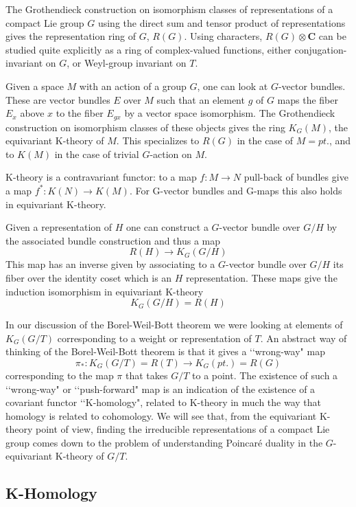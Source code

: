 \documentclass[a4paper,a4paper]{article}
\theoremstyle{conjecture}
\begin{document}
The Grothendieck construction on isomorphism classes of
representations of a compact Lie group $G$ using the direct sum and tensor product
of representations gives the representation
ring of $G$, $R(G)$.  Using characters, $R(G)\otimes \mathbf C$ can be studied quite explicitly
as a ring of complex-valued functions, either conjugation-invariant on $G$, or Weyl-group
invariant on $T$.

Given a space $M$ with an action of a group $G$, one can look at $G$-vector bundles. These are vector
bundles $E$ over $M$ such that an element $g$ of $G$ maps the fiber $E_x$ above $x$ to the fiber $E_{gx}$ by
a vector space isomorphism.  The Grothendieck construction on isomorphism classes of these objects gives
the ring $K_G(M)$, the equivariant K-theory of $M$.  This specializes to $R(G)$ in the case of $M=pt.$, and
to $K(M)$ in the case of trivial $G$-action on $M$.

K-theory is a contravariant functor: to a map $f:M\rightarrow N$ pull-back of
bundles give a map $f^*:K(N)\rightarrow K(M)$.  For G-vector bundles and
G-maps this also holds in equivariant K-theory.

Given a representation of $H$ one can construct a $G$-vector bundle
over $G/H$ by the associated bundle construction and thus a map
$$R(H)\longrightarrow K_G(G/H)$$
This map has an inverse
given by associating to a $G$-vector bundle over $G/H$ its fiber over the
identity coset which is an $H$ representation.  These maps give the induction
isomorphism in equivariant K-theory
$$K_G(G/H) = R(H)$$

In our discussion of the Borel-Weil-Bott theorem we were looking at elements
of $K_G(G/T)$ corresponding to a weight or representation of $T$.
An abstract way of thinking of the Borel-Weil-Bott theorem is that it
gives a \lq\lq wrong-way" map
$$\pi_*:K_G(G/T)=R(T)\rightarrow K_G(pt.)=R(G)$$
corresponding to the map $\pi$ that takes $G/T$ to a point.
The existence of such a \lq\lq wrong-way" or \lq\lq push-forward" map is an
indication of the existence of a covariant functor \lq\lq K-homology", related
to K-theory in much the way that homology is related to cohomology.
We will see that, from the equivariant K-theory point of view, finding the irreducible
representations of a compact Lie group comes down to the problem of
understanding Poincar\'e duality in the $G$-equivariant K-theory of $G/T$.

\subsection {K-Homology}
\end{document}
